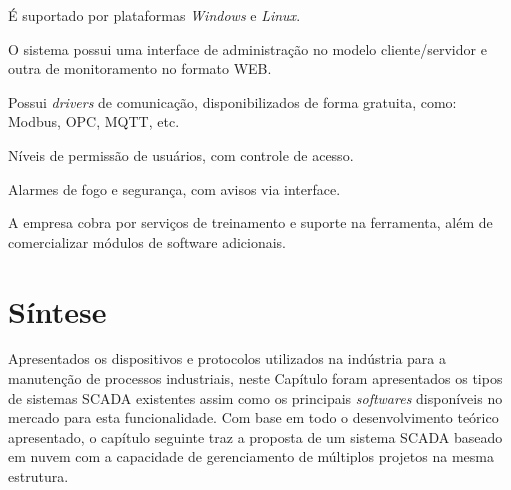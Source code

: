     \begin{alineascomponto}
        \item É suportado por plataformas \textit{Windows} e \textit{Linux}.
	    \item O sistema possui uma interface de administração no modelo cliente/servidor e outra de monitoramento no formato \gls{WEB}.
	    \item Possui \textit{drivers} de comunicação, disponibilizados de forma gratuita, como: Modbus, \gls{OPC}, \gls{MQTT}, etc.
	    \item Níveis de permissão de usuários, com controle de acesso.
	    \item Alarmes de fogo e segurança, com avisos via interface.
	    \item A empresa cobra por serviços de treinamento e suporte na ferramenta, além de comercializar módulos de software adicionais.
    \end{alineascomponto}
    
\section{Síntese}
\label{sec:sintese-scada}

Apresentados os dispositivos e protocolos utilizados na indústria para a manutenção de processos industriais, neste Capítulo foram apresentados os tipos de sistemas \gls{SCADA} existentes assim como os principais \textit{softwares} disponíveis no mercado para esta funcionalidade. Com base em todo o desenvolvimento teórico apresentado, o capítulo seguinte traz a proposta de um sistema \gls{SCADA} baseado em nuvem com a capacidade de gerenciamento de múltiplos projetos na mesma estrutura.